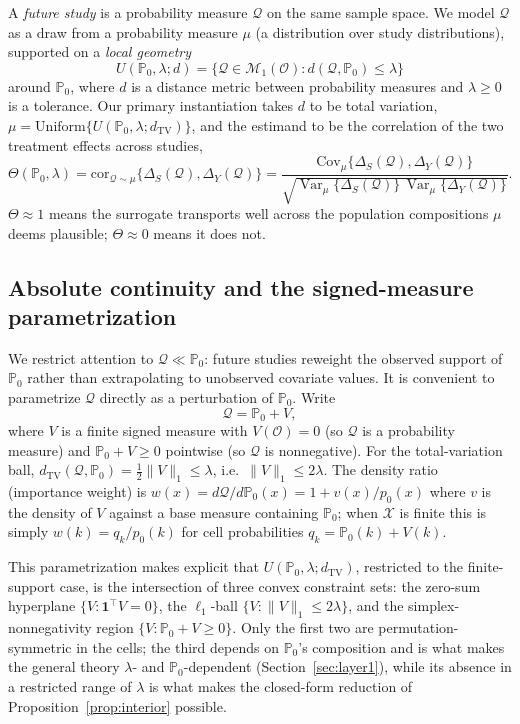 \documentclass[11pt]{article}
\theoremstyle{plain}
\theoremstyle{definition}
\theoremstyle{remark}
\newcommand{\PP}{\mathbb{P}}
\newcommand{\cX}{\mathcal{X}}
\newcommand{\cO}{\mathcal{O}}
\newcommand{\cM}{\mathcal{M}}
\newcommand{\Q}{\mathcal{Q}}
\newcommand{\Cov}{\mathrm{Cov}}
\newcommand{\Corr}{\mathrm{cor}}
\DeclareMathOperator{\Var}{Var}
\begin{document}
A \emph{future study} is a probability measure $\Q$ on the same sample space. We model
$\Q$ as a draw from a probability measure $\mu$ (a distribution over study
distributions), supported on a \emph{local geometry}
\begin{equation}\label{eq:geometry}
    U(\PP_0,\lambda;d) = \{\Q\in\cM_1(\cO): d(\Q,\PP_0)\le\lambda\}
\end{equation}
around $\PP_0$, where $d$ is a distance metric between probability measures and
$\lambda\ge0$ is a tolerance. Our primary instantiation takes $d$ to be total variation,
$\mu=\mathrm{Uniform}\{U(\PP_0,\lambda;d_{\mathrm{TV}})\}$, and the estimand to be the
correlation of the two treatment effects across studies,
\begin{equation}\label{eq:estimand}
    \Theta(\PP_0,\lambda) = \Corr_{\Q\sim\mu}\{\Delta_S(\Q),\Delta_Y(\Q)\}
    = \frac{\Cov_\mu\{\Delta_S(\Q),\Delta_Y(\Q)\}}
           {\sqrt{\Var_\mu\{\Delta_S(\Q)\}\,\Var_\mu\{\Delta_Y(\Q)\}}}.
\end{equation}
$\Theta\approx1$ means the surrogate transports well across the population
compositions $\mu$ deems plausible; $\Theta\approx0$ means it does not.

\subsection{Absolute continuity and the signed-measure parametrization}

We restrict attention to $\Q\ll\PP_0$: future studies reweight the observed support of
$\PP_0$ rather than extrapolating to unobserved covariate values. It is convenient to
parametrize $\Q$ directly as a perturbation of $\PP_0$. Write
\begin{equation}\label{eq:signed-measure}
    \Q = \PP_0 + V,
\end{equation}
where $V$ is a finite signed measure with $V(\cO)=0$ (so $\Q$ is a probability measure)
and $\PP_0+V\ge0$ pointwise (so $\Q$ is nonnegative). For the total-variation ball,
$d_{\mathrm{TV}}(\Q,\PP_0)=\tfrac12\|V\|_1\le\lambda$, i.e.\ $\|V\|_1\le2\lambda$. The
density ratio (importance weight) is $w(x)=d\Q/d\PP_0(x) = 1+v(x)/p_0(x)$ where $v$ is
the density of $V$ against a base measure containing $\PP_0$; when $\cX$ is finite this
is simply $w(k)=q_k/p_0(k)$ for cell probabilities $q_k=\PP_0(k)+V(k)$.

This parametrization makes explicit that $U(\PP_0,\lambda;d_{\mathrm{TV}})$, restricted
to the finite-support case, is the intersection of three convex constraint sets: the
zero-sum hyperplane $\{V:\mathbf{1}^\top V=0\}$, the $\ell_1$-ball
$\{V:\|V\|_1\le2\lambda\}$, and the simplex-nonnegativity region
$\{V:\PP_0+V\ge0\}$. Only the first two are permutation-symmetric in the cells; the
third depends on $\PP_0$'s composition and is what makes the general theory
$\lambda$- and $\PP_0$-dependent (Section~\ref{sec:layer1}), while its absence in a
restricted range of $\lambda$ is what makes the closed-form reduction of
Proposition~\ref{prop:interior} possible.
\end{document}

